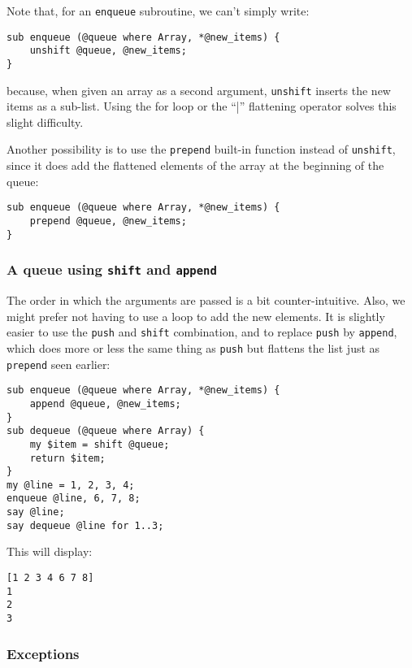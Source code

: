 Note that, for an \verb'enqueue' subroutine, we can't simply 
write:
\begin{verbatim}
sub enqueue (@queue where Array, *@new_items) {
    unshift @queue, @new_items;
}
\end{verbatim}
%
because, when given an array as a second argument, 
{\tt unshift} inserts the new items as a sub-list. 
Using the for loop or the ``|'' flattening operator 
solves this slight difficulty. 

Another possibility is to use the {\tt prepend} built-in 
function instead of {\tt unshift}, since it does add 
the flattened elements of the array at the beginning 
of the queue:

\begin{verbatim}
sub enqueue (@queue where Array, *@new_items) {
    prepend @queue, @new_items;
}
\end{verbatim}

\subsubsection{A queue using {\tt shift} and {\tt append}}

The order in which the arguments are passed is a bit 
counter-intuitive. Also, we might prefer not having to use 
a loop to add the new elements. It is slightly easier to use the {\tt push} 
and {\tt shift} combination, and to replace {\tt push} by 
{\tt append}, which does more or less the same thing as 
{\tt push} but flattens the list just as {\tt prepend} 
seen earlier:

\begin{verbatim}
sub enqueue (@queue where Array, *@new_items) {
    append @queue, @new_items;
}
sub dequeue (@queue where Array) {
    my $item = shift @queue;
    return $item;
}
my @line = 1, 2, 3, 4;
enqueue @line, 6, 7, 8;
say @line;
say dequeue @line for 1..3;
\end{verbatim}

This will display:

\begin{verbatim}
[1 2 3 4 6 7 8]
1
2
3
\end{verbatim}

\subsubsection{Exceptions}

